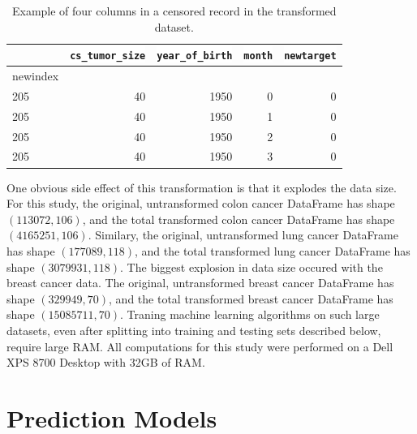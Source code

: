 \documentclass[a4paper,11pt]{article}
\newcommand{\codewhite}[1]{\colorbox{white}{\texttt{#1}}}
\begin{document}
\begin{table}[tbp]
\begin{center}
\begin{tabular}{lrrrr}
\toprule
{} &  \codewhite{cs\_tumor\_size} &  \codewhite{year\_of\_birth} &  \codewhite{month} &  \codewhite{newtarget} \\
\midrule
newindex &                &                &        &            \\
205      &             40 &           1950 &      0 &          0 \\
205      &             40 &           1950 &      1 &          0 \\
205      &             40 &           1950 &      2 &          0 \\
205      &             40 &           1950 &      3 &          0 \\
\bottomrule
\end{tabular}
\caption{\label{tab:transformedalive} Example of four columns in a censored record in the transformed dataset.}
\end{center}
\end{table}

One obvious side effect of this transformation is that it explodes the data size.
For this study, the original, untransformed colon cancer DataFrame has shape $(113072, 106)$, and the total transformed colon cancer DataFrame has shape $(4165251, 106)$.
Similary, the original, untransformed lung cancer DataFrame has shape $(177089, 118)$, and the total transformed lung cancer DataFrame has shape $(3079931, 118)$.
The biggest explosion in data size occured with the breast cancer data. 
The original, untransformed breast cancer DataFrame has shape $(329949, 70)$, and the total transformed breast cancer DataFrame has shape $(15085711, 70)$.
Traning machine learning algorithms on such large datasets, even after splitting into training and testing sets described below, require large RAM. All computations for this study were performed on a Dell XPS 8700 Desktop with 32GB of RAM.


\section{Prediction Models}
\label{sec:predmodels}
\end{document}
